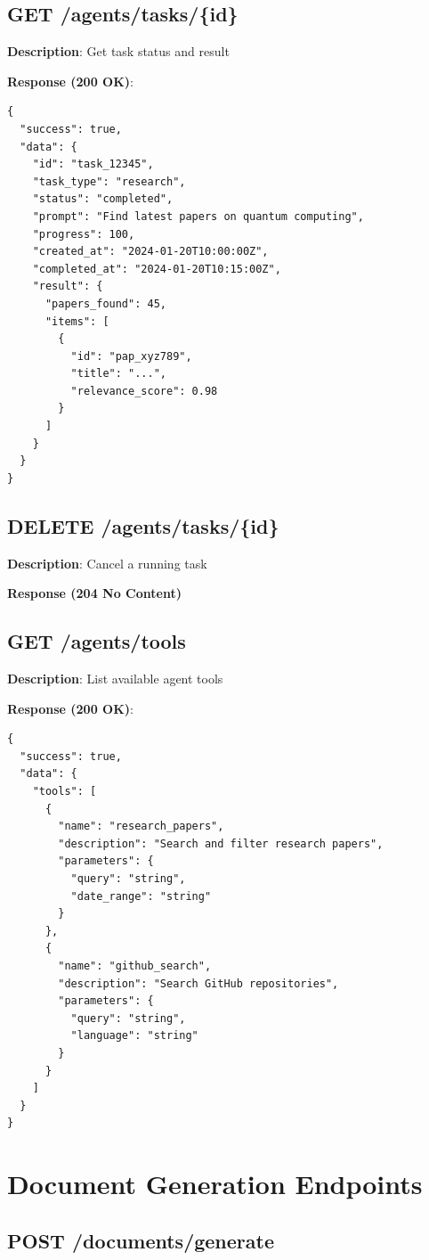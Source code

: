 \documentclass[12pt,a4paper]{report}
\begin{document}
\section{GET /agents/tasks/\{id\}}

\textbf{Description}: Get task status and result

\textbf{Response (200 OK)}:
\begin{lstlisting}
{
  "success": true,
  "data": {
    "id": "task_12345",
    "task_type": "research",
    "status": "completed",
    "prompt": "Find latest papers on quantum computing",
    "progress": 100,
    "created_at": "2024-01-20T10:00:00Z",
    "completed_at": "2024-01-20T10:15:00Z",
    "result": {
      "papers_found": 45,
      "items": [
        {
          "id": "pap_xyz789",
          "title": "...",
          "relevance_score": 0.98
        }
      ]
    }
  }
}
\end{lstlisting}

\section{DELETE /agents/tasks/\{id\}}

\textbf{Description}: Cancel a running task

\textbf{Response (204 No Content)}

\section{GET /agents/tools}

\textbf{Description}: List available agent tools

\textbf{Response (200 OK)}:
\begin{lstlisting}
{
  "success": true,
  "data": {
    "tools": [
      {
        "name": "research_papers",
        "description": "Search and filter research papers",
        "parameters": {
          "query": "string",
          "date_range": "string"
        }
      },
      {
        "name": "github_search",
        "description": "Search GitHub repositories",
        "parameters": {
          "query": "string",
          "language": "string"
        }
      }
    ]
  }
}
\end{lstlisting}


\chapter{Document Generation Endpoints}

\section{POST /documents/generate}
\end{document}
